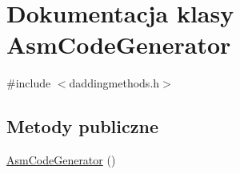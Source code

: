 \hypertarget{class_asm_code_generator}{\section{Dokumentacja klasy Asm\-Code\-Generator}
\label{class_asm_code_generator}
}


{\ttfamily \#include $<$daddingmethods.\-h$>$}

\subsection*{Metody publiczne}
\begin{DoxyCompactItemize}
\item 
\hyperlink{class_asm_code_generator_ae10580c9dd3ea1e0de47a50ad92143ea}{Asm\-Code\-Generator} ()
\end{DoxyCompactItemize}
